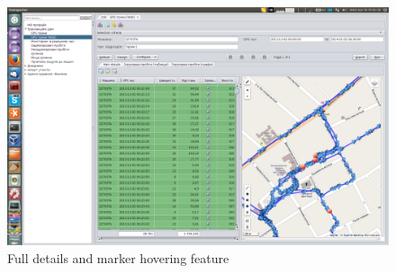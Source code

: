 \begin{figure}[H]
\centering
\includegraphics[width=\linewidth]{chapters/02-gpstracks/images/20-full-details-and-marker-hovering-feature.png}
\caption{Full details and marker hovering feature}\label{fig:20}
\end{figure}